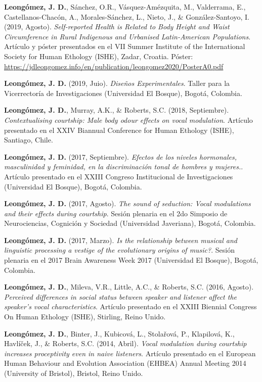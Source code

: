 \documentclass[11pt, a4paper]{awesome-cv}
\begin{document}
\textbf{Leongómez, J. D.}, Sánchez, O.R., Vásquez-Amézquita, M.,
Valderrama, E., Castellanos-Chacón, A., Morales-Sánchez, L., Nieto, J.,
\& González-Santoyo, I. (2019, Agosto). \emph{Self-reported Health is
Related to Body Height and Waist Circumference in Rural Indigenous and
Urbanised Latin-American Populations}. Artículo y póster presentados en
el VII Summer Institute of the International Society for Human Ethology
(ISHE), Zadar, Croatia. Póster:
\url{https://jdleongomez.info/en/publication/leongomez2020/PosterA0.pdf}

\textbf{Leongómez, J. D.} (2019, Juio). \emph{Diseños Experimentales}.
Taller para la Vicerrectoría de Investigaciones (Universidad El Bosque),
Bogotá, Colombia.

\textbf{Leongómez, J. D.}, Murray, A.K., \& Roberts, S.C. (2018,
Septiembre). \emph{Contextualising courtship: Male body odour effects on
vocal modulation}. Artículo presentado en el XXIV Biannual Conference
for Human Ethology (ISHE), Santiago, Chile.

\textbf{Leongómez, J. D.} (2017, Septiembre). \emph{Efectos de los
niveles hormonales, masculinidad y feminidad, en la discriminación tonal
de hombres y mujeres.}. Artículo presentado en el XXIII Congreso
Institucional de Investigaciones (Universidad El Bosque), Bogotá,
Colombia.

\textbf{Leongómez, J. D.} (2017, Agosto). \emph{The sound of seduction:
Vocal modulations and their effects during courtship}. Sesión plenaria
en el 2do Simposio de Neurociencias, Cognición y Sociedad (Universidad
Javeriana), Bogotá, Colombia.

\textbf{Leongómez, J. D.} (2017, Marzo). \emph{Is the relationship
between musical and linguistic processing a vestige of the evolutionary
origins of music?}. Sesión plenaria en el 2017 Brain Awareness Week 2017
(Universidad El Bosque), Bogotá, Colombia.

\textbf{Leongómez, J. D.}, Mileva, V.R., Little, A.C., \& Roberts, S.C.
(2016, Agosto). \emph{Perceived differences in social status between
speaker and listener affect the speaker's vocal characteristics}.
Artículo presentado en el XXIII Biennial Congress On Human Ethology
(ISHE), Stirling, Reino Unido.

\textbf{Leongómez, J. D.}, Binter, J., Kubicová, L., Stolařová, P.,
Klapilová, K., Havlíček, J., \& Roberts, S.C. (2014, Abril). \emph{Vocal
modulation during courtship increases proceptivity even in naive
listeners}. Artículo presentado en el European Human Behaviour and
Evolution Association (EHBEA) Annual Meeting 2014 (University of
Bristol), Bristol, Reino Unido.
\end{document}
